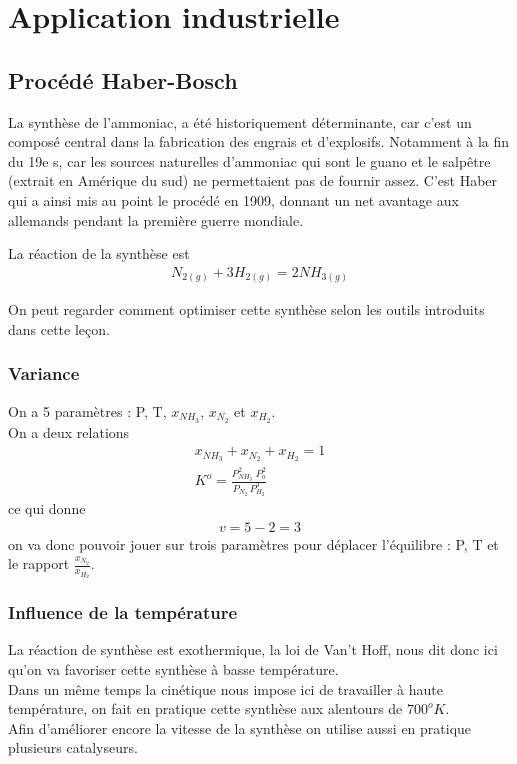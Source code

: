\documentclass[12pt,prb,aps,epsf]{report}
\begin{document}
\section{Application industrielle}

\subsection{Procédé Haber-Bosch}
La synthèse de l'ammoniac, a été historiquement déterminante, car c'est un composé central dans la fabrication des engrais et d'explosifs. Notamment à la fin du 19e s, car les sources naturelles d'ammoniac qui sont le guano et le salpêtre (extrait en Amérique du sud) ne permettaient pas de fournir assez. C'est Haber qui a ainsi mis au point le procédé en 1909, donnant un net avantage aux allemands pendant la première guerre mondiale. 

La réaction de la synthèse est 
\begin{eqnarray}
N_{2(g)} + 3H_{2(g)} = 2NH_{3(g)}
\end{eqnarray}

On peut regarder comment optimiser cette synthèse selon les outils introduits dans cette leçon.
\subsubsection{Variance}
On a 5 paramètres : P, T, $x_{NH_3}$, $x_{N_2}$ et $x_{H_2}$.\\
On a deux relations 
\begin{eqnarray}
x_{NH_3} + x_{N_2} + x_{H_2} =1\\
K^o = \frac{P_{NH_3}^2 \; P_o^2}{P_{N_2}\,P_{H_2}^3}
\end{eqnarray}
ce qui donne 
\begin{eqnarray}
v = 5-2=3
\end{eqnarray}
on va donc pouvoir jouer sur trois paramètres pour déplacer l'équilibre : P, T et le rapport $\frac{x_{N_2}}{x_{H_2}}$.
\subsubsection{Influence de la température}
La réaction de synthèse est exothermique, la loi de Van't Hoff, nous dit donc ici qu'on va favoriser cette synthèse à basse température.\\
Dans un même temps la cinétique nous impose ici de travailler à haute température, on fait en pratique cette synthèse aux alentours de $700^oK$.\\
Afin d'améliorer encore la vitesse de la synthèse on utilise aussi en pratique plusieurs catalyseurs.
\end{document}
